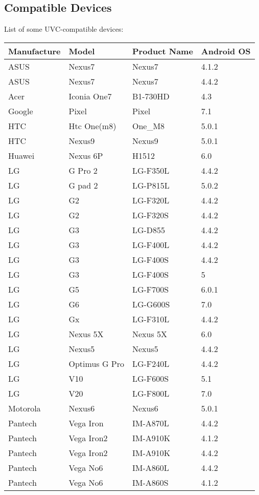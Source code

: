 \begin{appendices}
\chapter{Compatible Devices}
List of some UVC-compatible devices: \parencite{camerafi}
 
\begin{longtable}{ | l | l | l | l |}
Manufacture&Model&Product Name&Android OS\\ \hline
ASUS&Nexus7&Nexus7&4.1.2\\ \hline
ASUS&Nexus7&Nexus7&4.4.2\\ \hline
Acer&Iconia One7&B1-730HD&4.3\\ \hline
Google&Pixel&Pixel&7.1\\ \hline
HTC&Htc One(m8)&One\_M8&5.0.1\\ \hline
HTC&Nexus9&Nexus9&5.0.1\\ \hline
Huawei&Nexus 6P&H1512&6.0\\ \hline
LG&G Pro 2&LG-F350L&4.4.2\\ \hline
LG&G pad 2&LG-P815L&5.0.2\\ \hline
LG&G2&LG-F320L&4.4.2\\ \hline
LG&G2&LG-F320S&4.4.2\\ \hline
LG&G3&LG-D855&4.4.2\\ \hline
LG&G3&LG-F400L&4.4.2\\ \hline
LG&G3&LG-F400S&4.4.2\\ \hline
LG&G3&LG-F400S&5\\ \hline
LG&G5&LG-F700S&6.0.1\\ \hline
LG&G6&LG-G600S&7.0\\ \hline
LG&Gx&LG-F310L&4.4.2\\ \hline
LG&Nexus 5X&Nexus 5X&6.0\\ \hline
LG&Nexus5&Nexus5&4.4.2\\ \hline
LG&Optimus G Pro&LG-F240L&4.4.2\\ \hline
LG&V10&LG-F600S&5.1\\ \hline
LG&V20&LG-F800L&7.0\\ \hline
Motorola&Nexus6&Nexus6&5.0.1\\ \hline
Pantech&Vega Iron&IM-A870L&4.4.2\\ \hline
Pantech&Vega Iron2&IM-A910K&4.1.2\\ \hline
Pantech&Vega Iron2&IM-A910K&4.4.2\\ \hline
Pantech&Vega No6&IM-A860L&4.4.2\\ \hline
Pantech&Vega No6&IM-A860S&4.1.2\\ \hline

\end{longtable}
\end{appendices}
